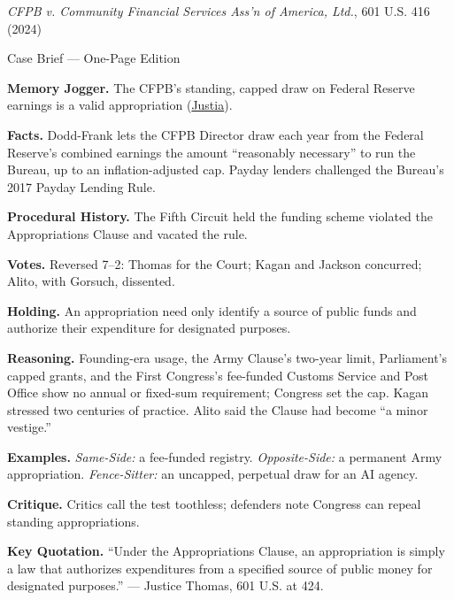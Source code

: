 \documentclass[12pt]{article}
\begin{document}
\begin{center}
{\Large \textit{CFPB v. Community Financial Services Ass'n of America, Ltd.}, 601 U.S. 416 (2024)\par}
\vspace{0.3em}
{\normalsize Case Brief --- One-Page Edition\par}
\end{center}

\textbf{Memory Jogger.} The CFPB's standing, capped draw on Federal Reserve earnings is a valid appropriation (\href{https://supreme.justia.com/cases/federal/us/601/22-448/}{Justia}).

\textbf{Facts.} Dodd-Frank lets the CFPB Director draw each year from the Federal Reserve's combined earnings the amount ``reasonably necessary'' to run the Bureau, up to an inflation-adjusted cap. Payday lenders challenged the Bureau's 2017 Payday Lending Rule.

\textbf{Procedural History.} The Fifth Circuit held the funding scheme violated the Appropriations Clause and vacated the rule.

\textbf{Votes.} Reversed 7--2: Thomas for the Court; Kagan and Jackson concurred; Alito, with Gorsuch, dissented.

\textbf{Holding.} An appropriation need only identify a source of public funds and authorize their expenditure for designated purposes.

\textbf{Reasoning.} Founding-era usage, the Army Clause's two-year limit, Parliament's capped grants, and the First Congress's fee-funded Customs Service and Post Office show no annual or fixed-sum requirement; Congress set the cap. Kagan stressed two centuries of practice. Alito said the Clause had become ``a minor vestige.''

\textbf{Examples.} \emph{Same-Side:} a fee-funded registry. \emph{Opposite-Side:} a permanent Army appropriation. \emph{Fence-Sitter:} an uncapped, perpetual draw for an AI agency.

\textbf{Critique.} Critics call the test toothless; defenders note Congress can repeal standing appropriations.

\textbf{Key Quotation.} ``Under the Appropriations Clause, an appropriation is simply a law that authorizes expenditures from a specified source of public money for designated purposes.'' --- Justice Thomas, 601 U.S. at 424.
\end{document}

